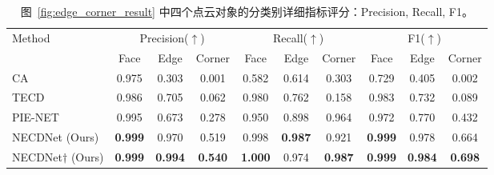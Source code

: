         

\begin{table}[ht]
    \small
    \centering
    \setlength{\tabcolsep}{5.5pt} %
    \caption{图~\ref{fig:edge_corner_result} 中四个点云对象的分类别详细指标评分：Precision, Recall, F1。}
    \label{tab:metrics_result_part1}
    \begin{threeparttable}
        
        \begin{tabular}{l ccc ccc ccc}
        \toprule
        Method & \multicolumn{3}{c}{Precision($\uparrow$)} & \multicolumn{3}{c}{Recall($\uparrow$)} & \multicolumn{3}{c}{F1($\uparrow$)} \\
        \cmidrule(lr){2-4} \cmidrule(lr){5-7} \cmidrule(lr){8-10} 
         & Face & Edge & Corner & Face & Edge & Corner & Face & Edge & Corner \\
        \midrule
        CA~\cite{bazazian_fast_2015} & 0.975 & 0.303 & 0.001 & 0.582 & 0.614 & 0.303 & 0.729 & 0.405 & 0.002 \\
        TECD~\cite{ahmed_edge_2018} & 0.986 & 0.705 & 0.062 & 0.980 & 0.762 & 0.158 & 0.983 & 0.732 & 0.089 \\
        PIE-NET~\cite{wang_pienet_2020a} & 0.995 & 0.673 & 0.278 & 0.950 & 0.898 & 0.964 & 0.972 & 0.770 & 0.432 \\
        NECDNet (Ours) & \textbf{0.999}& 0.970 & 0.519 & 0.998 & \textbf{0.987}& 0.921 & \textbf{0.999}& 0.978 & 0.664 \\
        NECDNet$\dagger$ (Ours) & \textbf{0.999}& \textbf{0.994}& \textbf{0.540}& \textbf{1.000}& 0.974 & \textbf{0.987}& \textbf{0.999}& \textbf{0.984}& \textbf{0.698} \\
        \bottomrule
        \end{tabular}
    \end{threeparttable}
\end{table}

